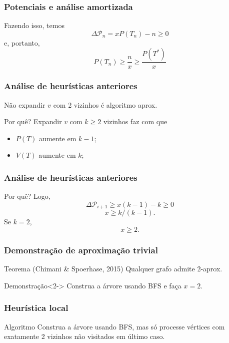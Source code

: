 \documentclass[14pt]{beamer}
\begin{document}
\begin{frame}
\frametitle{Potenciais e an\'alise amortizada}
Fazendo isso, temos
\begin{equation}
\Delta \mathcal{P}_n = xP(T_n) - n \ge 0
\end{equation}
e, portanto,
\begin{equation}
P(T_n) \ge \frac{n}{x} \ge \frac{P(T^*)}{x}
\end{equation}
\end{frame}

\begin{frame}
\frametitle{An\'alise de heur\'isticas anteriores}
N\~ao expandir $v$ com 2 vizinhos \'e algoritmo aprox.
\pause
\begin{block}{Por qu\^e?}
Expandir $v$ com $k \ge 2$ vizinhos faz com que
\begin{itemize}
\item $P(T)$ aumente em $k - 1$;
\item $V(T)$ aumente em $k$;
\end{itemize}
\end{block}
\end{frame}

\begin{frame}
\frametitle{An\'alise de heur\'isticas anteriores}
\begin{block}{Por qu\^e?}
Logo,
\begin{equation}
\Delta \mathcal{P}_{i + 1} \ge x(k - 1) - k \ge 0
\end{equation}
\begin{equation}
x \ge k/(k - 1).
\end{equation}
\pause
Se $k = 2$,
\begin{equation}
x \ge 2.
\end{equation}
\end{block}
\end{frame}

\begin{frame}
\frametitle{Demonstra\c{c}\~ao de aproxima\c{c}\~ao trivial}
\begin{block}{Teorema (Chimani \& Spoerhase, 2015)}
Qualquer grafo admite 2-aprox.
\end{block}

\begin{block}{Demonstra\c{c}\~ao}<2->
Construa a \'arvore usando BFS e fa\c{c}a $x = 2$.
\end{block}
\end{frame}

\begin{frame}
\frametitle{Heur\'istica local}
\begin{block}{Algoritmo}
Construa a \'arvore usando BFS, mas s\'o processe v\'ertices com exatamente 2 vizinhos n\~ao visitados em \'ultimo caso.
\end{block}
\end{frame}
\end{document}
